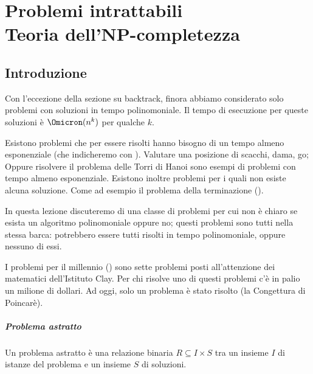 

\ifsubfile
\pagestyle{plain}
\setcounter{chapter}{17}


\fi
\chapter[Problemi intrattabili e Teoria dell'NP-completezza]{Problemi intrattabili\\Teoria dell'NP-completezza}

\section*{Introduzione}

Con l'eccezione della sezione su backtrack, finora abbiamo considerato solo problemi con soluzioni in tempo polinomoniale.
Il tempo di esecuzione per queste soluzioni è \(\Omicron(n^k)\) per qualche \(k\).

Esistono problemi che per essere risolti hanno bisogno di un tempo almeno esponenziale (che indicheremo con \EXPTIME).
Valutare una posizione di scacchi, dama, go; Oppure risolvere il problema delle Torri di Hanoi sono esempi di problemi con tempo almeno esponenziale.
Esistono inoltre problemi per i quali non esiste alcuna soluzione.
Come ad esempio il problema della terminazione ().

In questa lezione discuteremo di una classe di problemi per cui non è chiaro se esista un algoritmo polinomoniale oppure no; questi problemi sono tutti nella stessa barca: potrebbero essere tutti risolti in tempo polinomoniale, oppure nessuno di essi.

I problemi per il millennio () sono sette problemi posti all'attenzione dei matematici dell'Istituto Clay.
Per chi risolve uno di questi problemi c'è in palio un milione di dollari.
Ad oggi, solo un problema è stato risolto (la Congettura di Poincarè).

\paragraph{Problema astratto}
Un problema astratto è una relazione binaria \(R \subseteq I \times S\) tra un insieme \(I\) di istanze del problema e un insieme \(S\) di soluzioni.

